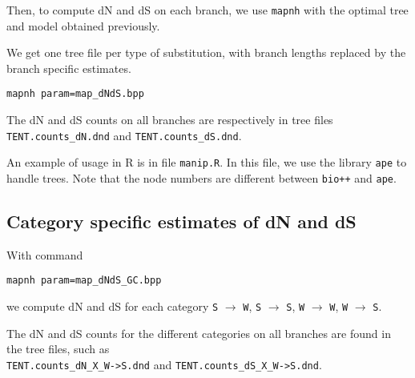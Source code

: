 \documentclass[11pt, a4paper]{article}
\begin{document}
Then, to compute dN and dS on each branch, we use \texttt{mapnh} with
the optimal tree and model obtained previously.

We get one tree file per type of substitution, with branch lengths
replaced by the branch specific estimates.

\begin{verbatim}
mapnh param=map_dNdS.bpp
\end{verbatim}

The dN and dS counts on all branches are respectively in tree files
\\ 
\verb|TENT.counts_dN.dnd| and
\verb|TENT.counts_dS.dnd|.

\smallskip

An example of usage in R is in file \texttt{manip.R}. In this file, we
use the library \texttt{ape} to handle trees. Note that the node
numbers are different between \texttt{bio++} and \texttt{ape}.

\subsection*{Category specific estimates of dN and dS}

With command

\begin{verbatim}
mapnh param=map_dNdS_GC.bpp
\end{verbatim}

we compute dN and dS for each category \texttt{S} $
\rightarrow $ \texttt{W}, \texttt{S} $
\rightarrow $ \texttt{S}, \texttt{W} $
\rightarrow $ \texttt{W}, \texttt{W} $
\rightarrow $ \texttt{S}.

The dN and dS counts for the different categories on all branches
are found in the tree files, such as \\ \verb|TENT.counts_dN_X_W->S.dnd| and
\verb|TENT.counts_dS_X_W->S.dnd|.
\end{document}
